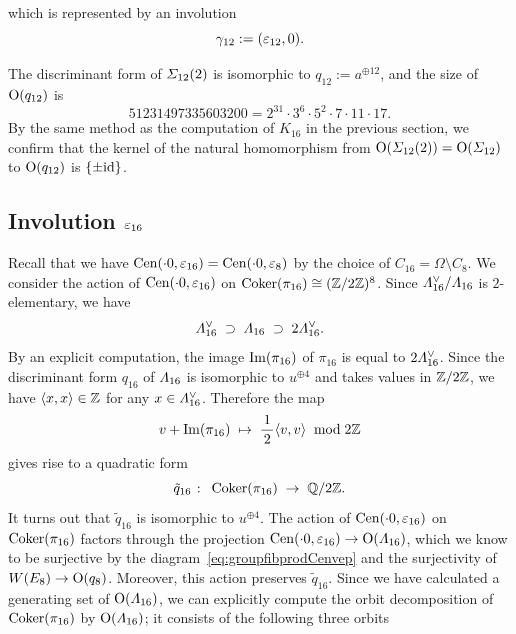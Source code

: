 \documentclass{amsart} %
\begin{document}
 which is 
 represented by an involution 
 \[
 \gamma_{12}:=(\varepsilon_{12}, 0).
 \]
 \begin{remark}\label{rem:q12}
 The discriminant form of $\varSigma_{12}(2)$ is isomorphic to
 $q_{12}:=a^{\oplus 12}$, 
and the size of $\mathord{\mathrm{O}}(q_{12})$ is 
\[
51231497335603200={2}^{31} \cdot {3}^{6} \cdot {5}^{2} \cdot {7} \cdot {11} \cdot {17}.
\]
 By the same method as the computation of $K_{16}$ in the previous section,
 we confirm that the kernel of the natural homomorphism from 
 $\mathord{\mathrm{O}}(\varSigma_{12}(2))=\mathord{\mathrm{O}}(\varSigma_{12})$ to $\mathord{\mathrm{O}}(q_{12})$ 
 is $\{\pm \mathord{\mathrm{id}}\}$.
 \end{remark}
\subsection{Involution $\varepsilon_{16}$}\label{subsec:vep16}
%
Recall that we have $\mathrm{Cen}(\cdot 0, \varepsilon_{16})=\mathrm{Cen}(\cdot 0, \varepsilon_{8})$
by the choice of $C_{16}=\Omega\setminus C_8$.
We consider the action of $\mathrm{Cen}(\cdot 0, \varepsilon_{16})$
on $\operatorname{Coker}(\pi_{16})\cong (\mathord{\mathbb{Z}}/2\mathord{\mathbb{Z}})^8$.
Since $\varLambda_{16}^{\vee}/\varLambda_{16}$ 
is $2$-elementary,
we have
%
\begin{equation} \label{eq:filteration}
\varLambda_{16}^{\vee} \;\supset\; \varLambda_{16}\; \supset \; 2\varLambda_{16}^{\vee}.
\end{equation}
%
By an explicit computation,
the image $\operatorname{Im}(\pi_{16})$ of $\pi_{16}$ is equal to $2\varLambda_{16}^{\vee}$.
Since the discriminant form $q_{16}$ of $\varLambda_{16}$ 
is isomorphic to $u^{\oplus 4}$ and takes values in $\mathord{\mathbb{Z}}/2\mathord{\mathbb{Z}}$,
we have $\langle x, x \rangle\in \mathord{\mathbb{Z}}$ for any $x\in \varLambda_{16}^{\vee}$.
Therefore the map
\[
v+\operatorname{Im} (\pi_{16}) \;\mapsto\; \frac{\,1\,}{2} \langle v, v \rangle \;\bmod 2\mathord{\mathbb{Z}}
\]
gives rise to a quadratic form 
\[
\tilde{q}_{16}\;\colon\; \operatorname{Coker} (\pi_{16})\;\to\; \mathord{\mathbb{Q}}/2\mathord{\mathbb{Z}}.
 \]
It turns out that $\tilde{q}_{16}$ is isomorphic to $u^{\oplus 4}$.
The action of $\mathrm{Cen}(\cdot 0, \varepsilon_{16})$ on $\operatorname{Coker} (\pi_{16})$ 
factors through the projection
$\mathrm{Cen}(\cdot 0, \varepsilon_{16})\to \mathord{\mathrm{O}}(\varLambda_{16})$,
which we know to be surjective
by the diagram~\eqref{eq:groupfibprodCenvep} and the surjectivity of 
$W(E_8)\to \mathord{\mathrm{O}}(q_8)$. 
Moreover, this action 
preserves $\tilde{q}_{16}$.
Since we have calculated a generating set of $\mathord{\mathrm{O}}(\varLambda_{16})$,
we can explicitly compute the orbit decomposition of $\operatorname{Coker} (\pi_{16})$
by $\mathord{\mathrm{O}}(\varLambda_{16})$; it consists of the following three orbits 
\end{document}
